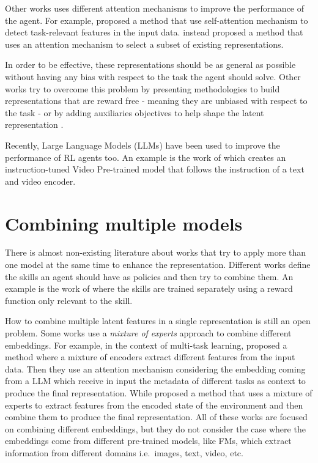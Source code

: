 Other works uses different attention mechanisms to improve the performance of the agent.
For example, \citet{bramlage2022generalized} proposed a method that use self-attention mechanism to detect task-relevant features in the input data.
\citet{blakeman2022selective} instead proposed a method that uses an attention mechanism to select a subset of existing representations.

In order to be effective, these representations should be as general as possible without having any bias with respect to the task the agent should solve.
Other works try to overcome this problem by presenting methodologies to build representations that are reward free - meaning they are unbiased with respect to the task \citep{stooke2021decoupling} - or by adding auxiliaries objectives to help shape the latent representation \citep{lan2023bootstrapped}.

Recently, Large Language Models (LLMs) have been used to improve the performance of RL agents too.
An example is the work of \citet{lifshitz2024steve} which creates an instruction-tuned Video Pre-trained model that follows the instruction of a text and video encoder.





\section{Combining multiple models}\label{sec:fm_rl_combination}
There is almost non-existing literature about works that try to apply more than one model at the same time to enhance the representation.
Different works define the skills an agent should have as policies and then try to combine them.
An example is the work of \citet{sahni2017learning} where the skills are trained separately using a reward function only relevant to the skill.

How to combine multiple latent features in a single representation is still an open problem.
Some works use a \textit{mixture of experts} approach to combine different embeddings.
For example, in the context of multi-task learning, \citet{sodhani2021multi} proposed a method where a mixture of encoders extract different features from the input data.
Then they use an attention mechanism considering the embedding coming from a LLM which receive in input the metadata of different tasks as context to produce the final representation.
While \citet{obando2024mixtures} proposed a method that uses a mixture of experts to extract features from the encoded state of the environment and then combine them to produce the final representation.
All of these works are focused on combining different embeddings, but they do not consider the case where the embeddings come from different pre-trained models, like FMs, which extract information from different domains i.e.\ images, text, video, etc.

